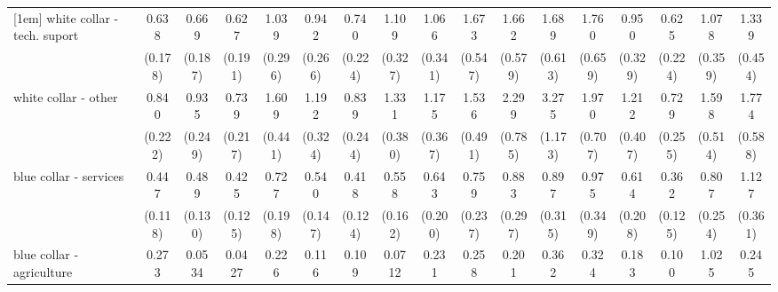 {\begin{tabular}{l*{16}{c}}
[1em]
white collar - tech. suport&       0.638         &       0.669         &       0.627         &       1.039         &       0.942         &       0.740         &       1.109         &       1.066         &       1.673         &       1.662         &       1.689         &       1.760         &       0.950         &       0.625         &       1.078         &       1.339         \\
                    &     (0.178)         &     (0.187)         &     (0.191)         &     (0.296)         &     (0.266)         &     (0.224)         &     (0.327)         &     (0.341)         &     (0.547)         &     (0.579)         &     (0.613)         &     (0.659)         &     (0.329)         &     (0.224)         &     (0.359)         &     (0.454)         \\
[1em]
white collar - other&       0.840         &       0.935         &       0.739         &       1.609         &       1.192         &       0.839         &       1.331         &       1.175         &       1.536         &       2.299\sym{*}  &       3.275\sym{***}&       1.970         &       1.212         &       0.729         &       1.598         &       1.774         \\
                    &     (0.222)         &     (0.249)         &     (0.217)         &     (0.441)         &     (0.324)         &     (0.244)         &     (0.380)         &     (0.367)         &     (0.491)         &     (0.785)         &     (1.173)         &     (0.707)         &     (0.407)         &     (0.255)         &     (0.514)         &     (0.588)         \\
[1em]
blue collar - services&       0.447\sym{**} &       0.489\sym{**} &       0.425\sym{**} &       0.727         &       0.540\sym{*}  &       0.418\sym{**} &       0.558\sym{*}  &       0.643         &       0.759         &       0.883         &       0.897         &       0.975         &       0.614         &       0.362\sym{**} &       0.807         &       1.127         \\
                    &     (0.118)         &     (0.130)         &     (0.125)         &     (0.198)         &     (0.147)         &     (0.124)         &     (0.162)         &     (0.200)         &     (0.237)         &     (0.297)         &     (0.315)         &     (0.349)         &     (0.208)         &     (0.125)         &     (0.254)         &     (0.361)         \\
[1em]
blue collar - agriculture&       0.273         &      0.0534\sym{***}&      0.0427\sym{**} &       0.226         &       0.116\sym{*}  &       0.109\sym{**} &      0.0712\sym{**} &       0.231         &       0.258         &       0.201\sym{*}  &       0.362         &       0.324         &       0.183         &       0.100\sym{**} &       1.025         &       0.245\sym{*}  \\

\end{tabular}}
